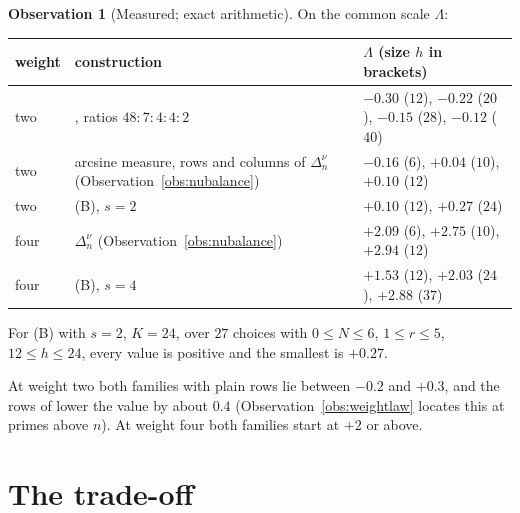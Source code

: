 \documentclass[11pt]{article}
\theoremstyle{definition}
\newtheorem{observation}[theorem]{Observation}
\begin{document}
\begin{observation}[Measured; exact arithmetic]\label{obs:fzscale}
On the common scale $\Lambda$:
\begin{center}
\small
\begin{tabular}{lp{5.4cm}p{6.2cm}}
\toprule
weight & construction & $\Lambda$ (size $h$ in brackets)\\
\midrule
two & \cite{OAI}, ratios $48:7:4:4:2$ & $-0.30$ ($12$), $-0.22$ ($20$), $-0.15$ ($28$), $-0.12$ ($40$)\\
two & arcsine measure, rows and columns of $\Delta^\nu_n$ (Observation~\ref{obs:nubalance}) & $-0.16$ ($6$), $+0.04$ ($10$), $+0.10$ ($12$)\\
two & (B), $s=2$ & $+0.10$ ($12$), $+0.27$ ($24$)\\
four & $\Delta^\nu_n$ (Observation~\ref{obs:nubalance}) & $+2.09$ ($6$), $+2.75$ ($10$), $+2.94$ ($12$)\\
four & (B), $s=4$ & $+1.53$ ($12$), $+2.03$ ($24$), $+2.88$ ($37$)\\
\bottomrule
\end{tabular}
\end{center}
For (B) with $s=2$, $K=24$, over $27$ choices with $0\le N\le6$, $1\le r\le5$, $12\le h\le24$, every value is positive and the smallest is $+0.27$.
\end{observation}

At weight two both families with plain rows lie between $-0.2$ and $+0.3$, and the rows of \cite{OAI} lower the value by about $0.4$ (Observation~\ref{obs:weightlaw} locates this at primes above $n$). At weight four both families start at $+2$ or above.

\section{The trade-off}\label{sec:tradeoff}
\end{document}
